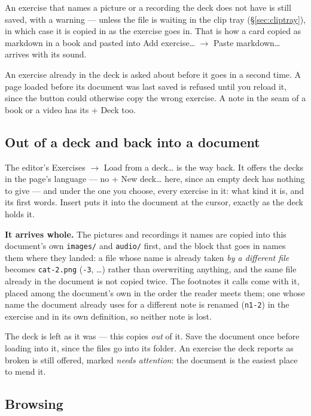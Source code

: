 \documentclass[11pt,oneside]{report}
\newcommand{\file}[1]{\texttt{#1}}
\newcommand{\menu}[1]{\textsf{#1}}
\begin{document}
An exercise that names a picture or a recording the deck does not have is
still saved, with a warning --- unless the file is waiting in the clip tray
(\S\ref{sec:cliptray}), in which case it is copied in as the exercise
goes in. That is how a card copied as markdown in a book and pasted into
\menu{Add exercise\ldots} $\rightarrow$ \menu{Paste markdown\ldots} arrives with
its sound.

An exercise already in the deck is asked about before it goes in a second
time. A page loaded before its document was last saved is refused until you
reload it, since the button could otherwise copy the wrong exercise. A note
in the seam of a book or a video has its \menu{+ Deck} too.

\subsection*{Out of a deck and back into a document}

The editor's \menu{Exercises} $\rightarrow$ \menu{Load from a deck\ldots} is
the way back. It offers the decks in the page's language --- no
\menu{+ New deck\ldots} here, since an empty deck has nothing to give --- and
under the one you choose, every exercise in it: what kind it is, and its
first words. \menu{Insert} puts it into the document at the cursor, exactly
as the deck holds it.

\textbf{It arrives whole.} The pictures and recordings it names are copied
into this document's own \file{images/} and \file{audio/} first, and the
block that goes in names them where they landed: a file whose name is
already taken \emph{by a different file} becomes \file{cat-2.png}
(\file{-3}, \ldots) rather than overwriting anything, and the same file
already in the document is not copied twice. The footnotes it calls come
with it, placed among the document's own in the order the reader meets them;
one whose name the document already uses for a different note is renamed
(\texttt{n1-2}) in the exercise and in its own definition, so neither note is
lost.

The deck is left as it was --- this copies \emph{out} of it. Save the
document once before loading into it, since the files go into its folder. An
exercise the deck reports as broken is still offered, marked \emph{needs
attention}: the document is the easiest place to mend it.

\subsection*{Browsing}
\end{document}
